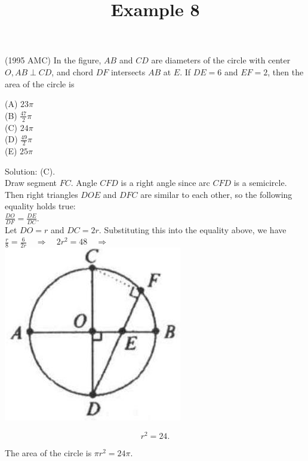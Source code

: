 \documentclass{article}
\title{Example 8}
\date{}
\begin{document}
\maketitle

(1995 AMC) In the figure, \(A B\) and \(C D\) are diameters of the circle with center \(O, A B \perp C D\), and chord \(D F\) intersects \(A B\) at \(E\). If \(D E=6\) and \(E F=2\), then the area of the circle is


(A) \(23 \pi\)\\
(B) \(\frac{47}{2} \pi\)\\
(C) \(24 \pi\)\\
(D) \(\frac{49}{2} \pi\)\\
(E) \(25 \pi\)

Solution: (C).\\
Draw segment \(F C\). Angle \(C F D\) is a right angle since arc \(C F D\) is a semicircle. Then right triangles \(D O E\) and \(D F C\) are similar to each other, so the following equality holds true:\\
\(\frac{D O}{D F}=\frac{D E}{D C}\).\\
Let \(D O=r\) and \(D C=2 r\). Substituting this into the equality above, we have \(\frac{r}{8}=\frac{6}{2 r} \quad \Rightarrow \quad 2 r^{2}=48 \quad \Rightarrow\)\\
\centering
\includegraphics[width=\textwidth]{images/167(1).jpg}

\[
r^{2}=24 .
\]

The area of the circle is \(\pi r^{2}=24 \pi\).
\end{document}
